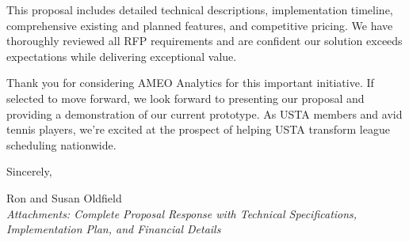 This proposal includes detailed technical descriptions, implementation timeline, comprehensive existing and planned features, and competitive pricing. We have thoroughly reviewed all RFP requirements and are confident our solution exceeds expectations while delivering exceptional value.

Thank you for considering AMEO Analytics for this important initiative. If selected to move forward, we look forward to presenting our proposal and providing a demonstration of our current prototype. As USTA members and avid tennis players, we're excited at the prospect of helping USTA transform league scheduling nationwide.

\vspace{0.3in}

Sincerely,

\vspace{0.4in}

Ron and Susan Oldfield\\


\textit{Attachments: Complete Proposal Response with Technical Specifications, Implementation Plan, and Financial Details}

\endgroup